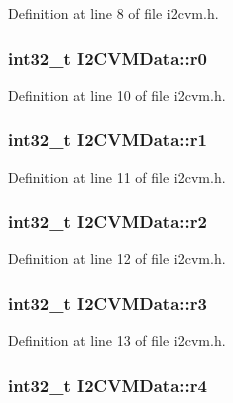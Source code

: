 \-Definition at line 8 of file i2cvm.\-h.

\hypertarget{struct_i2_c_v_m_data_a57f3e029983539b73d8e3003fdb6dc4a}{
\subsubsection[{r0}]{\setlength{\rightskip}{0pt plus 5cm}int32\-\_\-t {\bf \-I2\-C\-V\-M\-Data\-::r0}}}\label{struct_i2_c_v_m_data_a57f3e029983539b73d8e3003fdb6dc4a}


\-Definition at line 10 of file i2cvm.\-h.

\hypertarget{struct_i2_c_v_m_data_ae2818ce904b068618235b51a6c6d7e40}{
\subsubsection[{r1}]{\setlength{\rightskip}{0pt plus 5cm}int32\-\_\-t {\bf \-I2\-C\-V\-M\-Data\-::r1}}}\label{struct_i2_c_v_m_data_ae2818ce904b068618235b51a6c6d7e40}


\-Definition at line 11 of file i2cvm.\-h.

\hypertarget{struct_i2_c_v_m_data_abd3898745367cbba7a19f3c0a5f47afc}{
\subsubsection[{r2}]{\setlength{\rightskip}{0pt plus 5cm}int32\-\_\-t {\bf \-I2\-C\-V\-M\-Data\-::r2}}}\label{struct_i2_c_v_m_data_abd3898745367cbba7a19f3c0a5f47afc}


\-Definition at line 12 of file i2cvm.\-h.

\hypertarget{struct_i2_c_v_m_data_a1d5b72045630c265b07c8e4e158bc9d6}{
\subsubsection[{r3}]{\setlength{\rightskip}{0pt plus 5cm}int32\-\_\-t {\bf \-I2\-C\-V\-M\-Data\-::r3}}}\label{struct_i2_c_v_m_data_a1d5b72045630c265b07c8e4e158bc9d6}


\-Definition at line 13 of file i2cvm.\-h.

\hypertarget{struct_i2_c_v_m_data_a53ddf0fdf36d0e77d4573e671c87839d}{
\subsubsection[{r4}]{\setlength{\rightskip}{0pt plus 5cm}int32\-\_\-t {\bf \-I2\-C\-V\-M\-Data\-::r4}}}\label{struct_i2_c_v_m_data_a53ddf0fdf36d0e77d4573e671c87839d}


